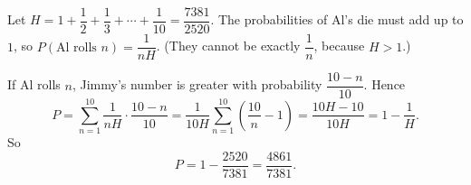 Let $H=1+\dfrac{1}{2}+\dfrac{1}{3}+\cdots+\dfrac{1}{10}=\dfrac{7381}{2520}$. The probabilities of Al's die must add up to $1$, so $P(\text{Al rolls }n)=\dfrac{1}{nH}$. (They cannot be exactly $\dfrac{1}{n}$, because $H>1$.)

If Al rolls $n$, Jimmy's number is greater with probability $\dfrac{10-n}{10}$. Hence
\[
P=\sum_{n=1}^{10}\dfrac{1}{nH}\cdot\dfrac{10-n}{10}=\dfrac{1}{10H}\sum_{n=1}^{10}\left(\dfrac{10}{n}-1\right)=\dfrac{10H-10}{10H}=1-\dfrac{1}{H} .
\]
So
\[
P=1-\dfrac{2520}{7381}=\boxed{\dfrac{4861}{7381}}.
\]
